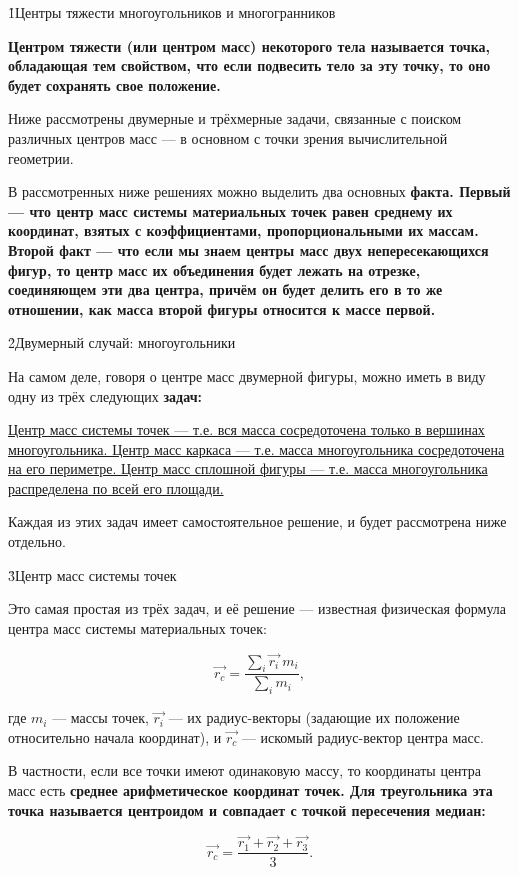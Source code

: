 \h1{Центры тяжести многоугольников и многогранников}

\bf{Центром тяжести} (или \bf{центром масс}) некоторого тела называется точка, обладающая тем свойством, что если подвесить тело за эту точку, то оно будет сохранять свое положение.

Ниже рассмотрены двумерные и трёхмерные задачи, связанные с поиском различных центров масс --- в основном с точки зрения вычислительной геометрии.

В рассмотренных ниже решениях можно выделить два основных \bf{факта}. Первый --- что центр масс системы материальных точек равен среднему их координат, взятых с коэффициентами, пропорциональными их массам. Второй факт --- что если мы знаем центры масс двух непересекающихся фигур, то центр масс их объединения будет лежать на отрезке, соединяющем эти два центра, причём он будет делить его в то же отношении, как масса второй фигуры относится к массе первой.


\h2{Двумерный случай: многоугольники}

На самом деле, говоря о центре масс двумерной фигуры, можно иметь в виду одну из трёх следующих \bf{задач}:

\ul{
\li Центр масс системы точек --- т.е. вся масса сосредоточена только в вершинах многоугольника.
\li Центр масс каркаса --- т.е. масса многоугольника сосредоточена на его периметре.
\li Центр масс сплошной фигуры --- т.е. масса многоугольника распределена по всей его площади.
}

Каждая из этих задач имеет самостоятельное решение, и будет рассмотрена ниже отдельно.


\h3{Центр масс системы точек}

Это самая простая из трёх задач, и её решение --- известная физическая формула центра масс системы материальных точек:

$$ \vec{r_c} = \frac{ \sum\limits_i \vec{r_i} ~ m_i }{ \sum\limits_i m_i }, $$

где $m_i$ --- массы точек, $\vec{r_i}$ --- их радиус-векторы (задающие их положение относительно начала координат), и $\vec{r_c}$ --- искомый радиус-вектор центра масс.

В частности, если все точки имеют одинаковую массу, то координаты центра масс есть \bf{среднее арифметическое} координат точек. Для \bf{треугольника} эта точка называется \bf{центроидом} и совпадает с точкой пересечения медиан:

$$ \vec{r_c} = \frac{ \vec{r_1} + \vec{r_2} + \vec{r_3} }{ 3 }. $$

